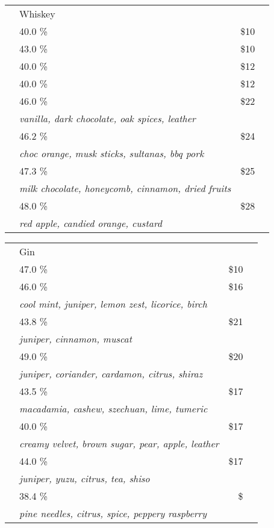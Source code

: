 \documentclass[12pt]{article}
\makeatletter
\newcommand*\ColText[1]{\textcolor{SpringGreen4}{#1}}
\newcommand*\GroupGlassTitle[2]{%
  \noalign{\vspace{2em}}
  \fontfamily{qzc}\selectfont #2 & \vspace{1em}\fontsize{20}{29}\selectfont\ColText{#1}}
\newenvironment{Group}
  {\vspace{2em}\noindent\begin{tabular*}{\textwidth}{@{} p{10mm} l@{\extracolsep{\fill}} r@{\hspace{1em}} r@{}}} %
  {\end{tabular*}}
\newcommand*\Booze[3]{%
  \noalign{\vspace{1em}}
  \multicolumn{2}{l}{ #1 \tiny\dotfill } & \scriptsize #2 \% \tiny\dotfill & \normalsize \$#3}
\newcommand*\Expl[1]{%
  {} & \hspace*{0.1em} \scriptsize #1}
\newcommand*\Glass[2]{%
    \begin{tikzpicture}[remember picture,overlay]
        \node[xshift=5mm,yshift=0mm]{%
            \texttt{[image: Glasses/\#1.png]}
        };
    \end{tikzpicture}%
}
\newcommand*\GlassGlencairn{%
    \Glass{glencairn}{4mm}}
\newcommand*\GlassHighball{%
    \Glass{highball}{6mm}}
\makeatother
\begin{document}
\begin{Group}
    \GroupGlassTitle{Whiskey}{\GlassGlencairn} \\
    \Booze{Jameson Blended Irish Whiskey}{40.0}{10} \\
    \Booze{Grants Triple Wood Blended Scotch}{43.0}{10} \\
    \Booze{Starward Two-fold Double Grain}{40.0}{12} \\
    \Booze{Chivas Regal 12yo Blended Scotch}{40.0}{12} \\
    \Booze{anCnoc Highland Single Malt 13yo}{46.0}{22}\\
    \Expl{\it vanilla, dark chocolate, oak spices, leather} \\
    \Booze{Hellyers Road Pinot Noir Cask 16yo}{46.2}{24}\\
    \Expl{\it choc orange, musk sticks, sultanas, bbq pork} \\
    \Booze{Glenmorangie 12 YO Malaga Cask 17yo}{47.3}{25}\\
    \Expl{\it milk chocolate, honeycomb, cinnamon, dried fruits} \\
    \Booze{Ballantines Glenburgie Single Malt 17yo}{48.0}{28}\\
    \Expl{\it red apple, candied orange, custard} \\
\end{Group}
\vfill
\begin{center}
	
\end{center}
\pagebreak
\begin{Group}
    \GroupGlassTitle{Gin}{\GlassHighball} \\
    \Booze{Bombay Sapphire}{47.0}{10} \\
    \Booze{The Botanist}{46.0}{16}\\
    \Expl{\it cool mint, juniper, lemon zest, licorice, birch} \\
    \Booze{Four Pillars Christmas 2019}{43.8}{21}\\
    \Expl{\it juniper, cinnamon, muscat} \\
    \Booze{Giniversity Barrel Aged}{49.0}{20}\\
    \Expl{\it juniper, coriander, cardamon, citrus, shiraz} \\
    \Booze{Four Pillars Spice Trade Gin}{43.5}{17}\\
    \Expl{\it macadamia, cashew, szechuan, lime, tumeric} \\
    \Booze{Hartsthorn Sheep's Whey Gin}{40.0}{17}\\
    \Expl{\it creamy velvet, brown sugar, pear, apple, leather} \\
    \Booze{Reed \& Co Neo Dry Gin}{44.0}{17}\\
    \Expl{\it juniper, yuzu, citrus, tea, shiso} \\
    \Booze{Four Pillars Bloody Shiraz Gin}{38.4}{}\\
    \Expl{\it pine needles, citrus, spice, peppery raspberry} \\
\end{Group}
\vfill
\begin{center}
	
\end{center}
\pagebreak
\end{document}
